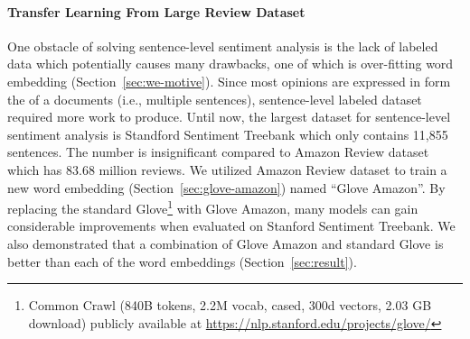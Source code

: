 \paragraph{Transfer Learning From Large Review Dataset} One obstacle of solving sentence-level sentiment analysis is the lack of labeled data which potentially causes many drawbacks, one of which is over-fitting word embedding (Section~\ref{sec:we-motive}).
Since most opinions are expressed in form the of  a documents (i.e., multiple sentences), sentence-level labeled dataset required more work to produce.
Until now, the largest dataset for sentence-level sentiment analysis is Standford Sentiment Treebank which only contains 11,855 sentences.
The number is insignificant compared to Amazon Review dataset which has 83.68 million reviews.
We utilized Amazon Review dataset to train a new word embedding (Section~\ref{sec:glove-amazon}) named ``Glove Amazon''.
By replacing the standard Glove\footnote{Common Crawl (840B tokens, 2.2M vocab, cased, 300d vectors, 2.03 GB download) publicly available at \url{https://nlp.stanford.edu/projects/glove/}} with Glove Amazon, many models can gain considerable improvements when evaluated on Stanford Sentiment Treebank.
We also demonstrated that a combination of Glove Amazon and standard Glove is better than each of the word embeddings (Section~\ref{sec:result}).
